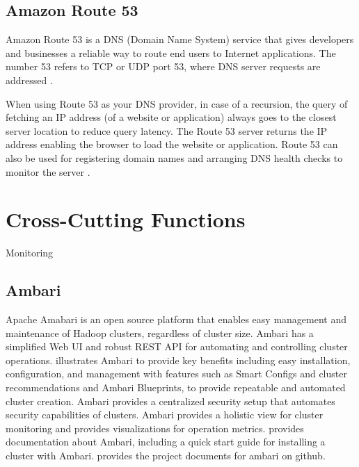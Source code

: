 \subsection{ Amazon Route 53}

     Amazon Route 53 is a DNS (Domain Name System) service that gives
     developers and businesses a reliable way to route end users to
     Internet applications. The number 53 refers to TCP or UDP port
     53, where DNS server requests are addressed \cite{www-ar53}.
     
     When using Route 53 as your DNS provider, in case of a recursion,
     the query of fetching an IP address (of a website or application)
     always goes to the closest server location to reduce query
     latency. The Route 53 server returns the IP address enabling the
     browser to load the website or application. Route 53 can also be
     used for registering domain names and arranging DNS health
     checks to monitor the server \cite{www-amar53}.

\section{Cross-Cutting Functions}

Monitoring


\subsection{ Ambari}

     Apache Amabari is an open source platform that enables easy
     management and maintenance of Hadoop clusters, regardless of
     cluster size. Ambari has a simplified Web UI and robust REST API
     for automating and controlling cluster operations.
     \cite{www-hortonworks-ambari} illustrates Ambari to provide key
     benefits including easy installation, configuration, and
     management with features such as Smart Configs and cluster
     recommendations and Ambari Blueprints, to provide repeatable and
     automated cluster creation. Ambari provides a centralized
     security setup that automates security capabilities of
     clusters. Ambari provides a holistic view for cluster monitoring
     and provides visualizations for operation
     metrics. \cite{www-ambari} provides documentation about Ambari,
     including a quick start guide for installing a cluster with
     Ambari. \cite{www-github-ambari} provides the project documents
     for ambari on github.
     
